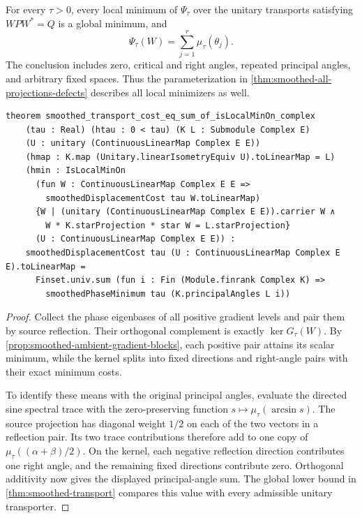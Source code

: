 \begin{theorem}
\label{thm:smoothed-local-global}
For every $\tau>0$, every local minimum of $\Psi_\tau$ over the unitary
transports satisfying $WPW^*=Q$ is a global minimum, and
\[
 \Psi_\tau(W)=\sum_{j=1}^r\mu_\tau(\theta_j).
\]
The conclusion includes zero, critical and right angles, repeated
principal angles, and arbitrary fixed spaces. Thus the parameterization
in \cref{thm:smoothed-all-projections-defects} describes all local
minimizers as well.
\end{theorem}

\begin{lstlisting}[style=leanpaper,
 caption={Lean signature for the exact value at every constrained local
 minimum. The surrounding finite-dimensional complex Hilbert-space context
 is omitted. The feasible set contains all ambient unitary transports.},
 label={lst:smoothed-local-global}]
theorem smoothed_transport_cost_eq_sum_of_isLocalMinOn_complex
    (tau : Real) (htau : 0 < tau) (K L : Submodule Complex E)
    (U : unitary (ContinuousLinearMap Complex E E))
    (hmap : K.map (Unitary.linearIsometryEquiv U).toLinearMap = L)
    (hmin : IsLocalMinOn
      (fun W : ContinuousLinearMap Complex E E =>
        smoothedDisplacementCost tau W.toLinearMap)
      {W | (unitary (ContinuousLinearMap Complex E E)).carrier W ∧
        W * K.starProjection * star W = L.starProjection}
      (U : ContinuousLinearMap Complex E E)) :
    smoothedDisplacementCost tau (U : ContinuousLinearMap Complex E E).toLinearMap =
      Finset.univ.sum (fun i : Fin (Module.finrank Complex K) =>
        smoothedPhaseMinimum tau (K.principalAngles L i))
\end{lstlisting}

\begin{proof}
Collect the phase eigenbases of all positive gradient levels and pair
them by source reflection. Their orthogonal complement is exactly
$\ker G_\tau(W)$. By \cref{prop:smoothed-ambient-gradient-blocks}, each
positive pair attains its scalar minimum, while the kernel splits into
fixed directions and right-angle pairs with their exact minimum costs.

To identify these means with the original principal angles, evaluate
the directed sine spectral trace with the zero-preserving function
$s\mapsto\mu_\tau(\arcsin s)$. The source projection has diagonal
weight $1/2$ on each of the two vectors in a reflection pair. Its two
trace contributions therefore add to one copy of
$\mu_\tau((\alpha+\beta)/2)$. On the kernel, each negative reflection
direction contributes one right angle, and the remaining fixed directions
contribute zero. Orthogonal additivity now gives the displayed
principal-angle sum. The global lower bound in
\cref{thm:smoothed-transport} compares this value with every admissible
unitary transporter.
\end{proof}


